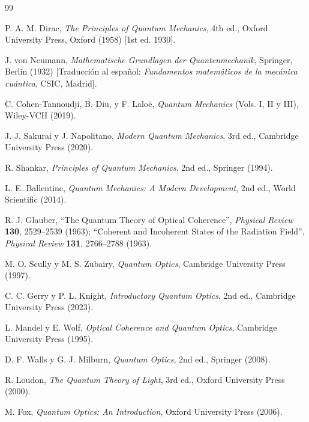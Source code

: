 \documentclass[11pt,a4paper]{book}
\begin{document}
\begin{thebibliography}{99}

P. A. M. Dirac, \textit{The Principles of Quantum Mechanics}, 4th ed., Oxford University Press, Oxford (1958) [1st ed. 1930].

J. von Neumann, \textit{Mathematische Grundlagen der Quantenmechanik}, Springer, Berlin (1932) [Traducción al español: \textit{Fundamentos matemáticos de la mecánica cuántica}, CSIC, Madrid].

C. Cohen-Tannoudji, B. Diu, y F. Laloë, \textit{Quantum Mechanics} (Vols. I, II y III), Wiley-VCH (2019).

J. J. Sakurai y J. Napolitano, \textit{Modern Quantum Mechanics}, 3rd ed., Cambridge University Press (2020).

R. Shankar, \textit{Principles of Quantum Mechanics}, 2nd ed., Springer (1994).

L. E. Ballentine, \textit{Quantum Mechanics: A Modern Development}, 2nd ed., World Scientific (2014).

R. J. Glauber, ``The Quantum Theory of Optical Coherence'', \textit{Physical Review} \textbf{130}, 2529--2539 (1963); ``Coherent and Incoherent States of the Radiation Field'', \textit{Physical Review} \textbf{131}, 2766--2788 (1963).

M. O. Scully y M. S. Zubairy, \textit{Quantum Optics}, Cambridge University Press (1997).

C. C. Gerry y P. L. Knight, \textit{Introductory Quantum Optics}, 2nd ed., Cambridge University Press (2023).

L. Mandel y E. Wolf, \textit{Optical Coherence and Quantum Optics}, Cambridge University Press (1995).

D. F. Walls y G. J. Milburn, \textit{Quantum Optics}, 2nd ed., Springer (2008).

R. Loudon, \textit{The Quantum Theory of Light}, 3rd ed., Oxford University Press (2000).

M. Fox, \textit{Quantum Optics: An Introduction}, Oxford University Press (2006).


\end{thebibliography}
\end{document}
